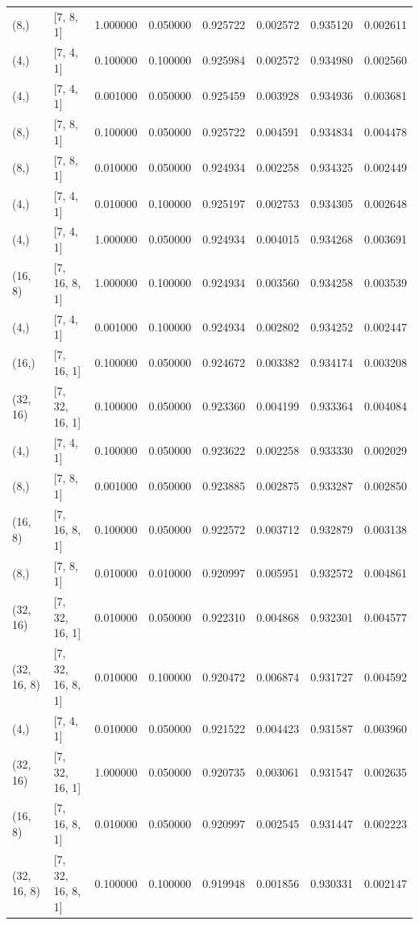 \begin{tabular}{llrrrrrr}
(8,) & [7, 8, 1] & 1.000000 & 0.050000 & 0.925722 & 0.002572 & 0.935120 & 0.002611 \\
(4,) & [7, 4, 1] & 0.100000 & 0.100000 & 0.925984 & 0.002572 & 0.934980 & 0.002560 \\
(4,) & [7, 4, 1] & 0.001000 & 0.050000 & 0.925459 & 0.003928 & 0.934936 & 0.003681 \\
(8,) & [7, 8, 1] & 0.100000 & 0.050000 & 0.925722 & 0.004591 & 0.934834 & 0.004478 \\
(8,) & [7, 8, 1] & 0.010000 & 0.050000 & 0.924934 & 0.002258 & 0.934325 & 0.002449 \\
(4,) & [7, 4, 1] & 0.010000 & 0.100000 & 0.925197 & 0.002753 & 0.934305 & 0.002648 \\
(4,) & [7, 4, 1] & 1.000000 & 0.050000 & 0.924934 & 0.004015 & 0.934268 & 0.003691 \\
(16, 8) & [7, 16, 8, 1] & 1.000000 & 0.100000 & 0.924934 & 0.003560 & 0.934258 & 0.003539 \\
(4,) & [7, 4, 1] & 0.001000 & 0.100000 & 0.924934 & 0.002802 & 0.934252 & 0.002447 \\
(16,) & [7, 16, 1] & 0.100000 & 0.050000 & 0.924672 & 0.003382 & 0.934174 & 0.003208 \\
(32, 16) & [7, 32, 16, 1] & 0.100000 & 0.050000 & 0.923360 & 0.004199 & 0.933364 & 0.004084 \\
(4,) & [7, 4, 1] & 0.100000 & 0.050000 & 0.923622 & 0.002258 & 0.933330 & 0.002029 \\
(8,) & [7, 8, 1] & 0.001000 & 0.050000 & 0.923885 & 0.002875 & 0.933287 & 0.002850 \\
(16, 8) & [7, 16, 8, 1] & 0.100000 & 0.050000 & 0.922572 & 0.003712 & 0.932879 & 0.003138 \\
(8,) & [7, 8, 1] & 0.010000 & 0.010000 & 0.920997 & 0.005951 & 0.932572 & 0.004861 \\
(32, 16) & [7, 32, 16, 1] & 0.010000 & 0.050000 & 0.922310 & 0.004868 & 0.932301 & 0.004577 \\
(32, 16, 8) & [7, 32, 16, 8, 1] & 0.010000 & 0.100000 & 0.920472 & 0.006874 & 0.931727 & 0.004592 \\
(4,) & [7, 4, 1] & 0.010000 & 0.050000 & 0.921522 & 0.004423 & 0.931587 & 0.003960 \\
(32, 16) & [7, 32, 16, 1] & 1.000000 & 0.050000 & 0.920735 & 0.003061 & 0.931547 & 0.002635 \\
(16, 8) & [7, 16, 8, 1] & 0.010000 & 0.050000 & 0.920997 & 0.002545 & 0.931447 & 0.002223 \\
(32, 16, 8) & [7, 32, 16, 8, 1] & 0.100000 & 0.100000 & 0.919948 & 0.001856 & 0.930331 & 0.002147 \\

\end{tabular}
